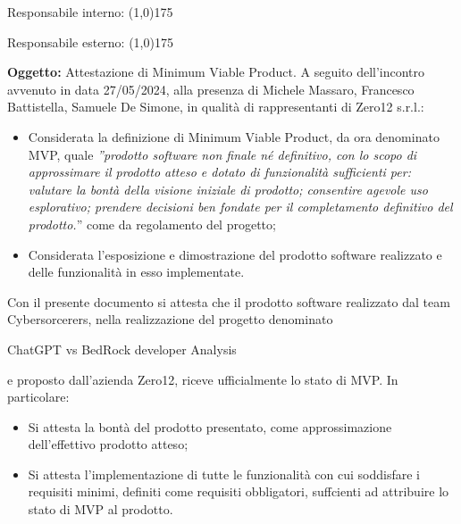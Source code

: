 \documentclass{article}
\begin{document}
\vspace{50pt}
Responsabile interno: \line(1,0){175}\par
\vspace{35pt}
Responsabile esterno: \line(1,0){175}

\newpage

\textbf{Oggetto:} Attestazione di Minimum Viable Product.
A seguito dell’incontro avvenuto in data 27/05/2024, alla presenza di Michele Massaro, Francesco Battistella, Samuele De Simone, in qualità di rappresentanti di Zero12 s.r.l.:
\begin{itemize}
    \item Considerata la definizione di Minimum Viable Product, da ora denominato MVP, quale \textit{”prodotto software non finale né definitivo, con lo scopo di approssimare il prodotto atteso e dotato di funzionalità sufficienti per: valutare la bontà della visione iniziale di prodotto; consentire agevole uso esplorativo; prendere decisioni ben fondate per il completamento definitivo del prodotto.}” come da regolamento del progetto;
    \item Considerata l’esposizione e dimostrazione del prodotto software realizzato e delle funzionalità in esso implementate.
\end{itemize}

Con il presente documento si attesta che il prodotto software realizzato dal team Cybersorcerers, nella realizzazione del progetto denominato
\newline
\begin{center}
    ChatGPT vs BedRock developer Analysis
\end{center}
e proposto dall’azienda Zero12, riceve ufficialmente lo stato di MVP.
In particolare:
\begin{itemize}
    \item Si attesta la bontà del prodotto presentato, come approssimazione dell’effettivo prodotto atteso;
    \item Si attesta l’implementazione di tutte le funzionalità con cui soddisfare i requisiti minimi, definiti come requisiti obbligatori, suffcienti ad attribuire lo stato di MVP al prodotto.
\end{itemize}
\end{document}
